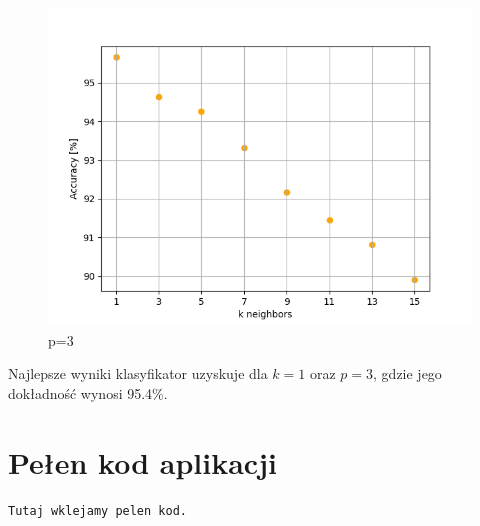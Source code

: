 \documentclass[12pt,a4paper]{article}
\begin{document}
\begin{figure}[!h]
	\includegraphics[scale=0.8]{"knn3.png"}
	\centering
	\caption{p=3}
\end{figure}

Najlepsze wyniki klasyfikator uzyskuje dla $k = 1$ oraz $p = 3$, gdzie jego dokładność wynosi 95.4\%.
\newpage
\section*{Pełen kod aplikacji}
\begin{lstlisting}
Tutaj wklejamy pelen kod. 
\end{lstlisting}
\end{document}
